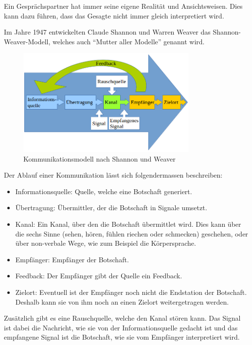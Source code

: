 Ein Gesprächspartner hat immer seine eigene Realität und Ansichtsweisen. Dies kann dazu führen, dass das Gesagte nicht immer gleich interpretiert wird. 

Im Jahre 1947 entwickelten Claude Shannon und Warren Weaver das Shannon-Weaver-Modell, welches auch "`Mutter aller Modelle"' genannt wird.

\begin{figure}[H]
  \centering
  \includegraphics[width=0.8\textwidth]{images/shannon-weaver-model.png}
  \caption[Kommunikationsmodell nach Shannon und Weaver]{Kommunikationsmodell nach Shannon und Weaver}
  \label{fig:socialengineering:Kommunikation:Kommunikationsmodell:shannon-weaver-model}
\end{figure}

Der Ablauf einer Kommunikation lässt sich folgendermassen beschreiben:
\begin{itemize}
\item Informationsquelle: Quelle, welche eine Botschaft generiert.
\item Übertragung: Übermittler, der die Botschaft in Signale umsetzt.
\item Kanal: Ein Kanal, über den die Botschaft übermittlet wird. Dies kann über die sechs Sinne (sehen, hören, fühlen riechen oder schmecken) geschehen, oder über non-verbale Wege, wie zum Beispiel die Körpersprache.
\item Empfänger: Empfänger der Botschaft.
\item Feedback: Der Empfänger gibt der Quelle ein Feedback.
\item Zielort: Eventuell ist der Empfänger noch nicht die Endstation der Botschaft. Deshalb kann sie von ihm noch an einen Zielort weitergetragen werden.
\end{itemize}
Zusätzlich gibt es eine Rauschquelle, welche den Kanal stören kann. Das Signal ist dabei die Nachricht, wie sie von der Informationsquelle gedacht ist und das empfangene Signal ist die Botschaft, wie sie vom Empfänger interpretiert wird.

